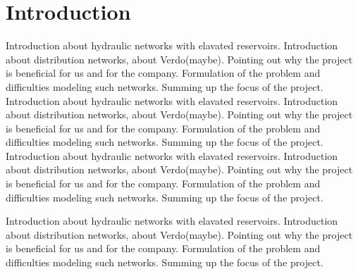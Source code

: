 \chapter{Introduction}
\label{introduction}

Introduction about hydraulic networks with elavated reservoirs. Introduction about distribution networks, about Verdo(maybe). Pointing out why the project is beneficial for us and for the company. Formulation of the problem and difficulties modeling such networks. Summing up the focus of the project. 
Introduction about hydraulic networks with elavated reservoirs. Introduction about distribution networks, about Verdo(maybe). Pointing out why the project is beneficial for us and for the company. Formulation of the problem and difficulties modeling such networks. Summing up the focus of the project. 
Introduction about hydraulic networks with elavated reservoirs. Introduction about distribution networks, about Verdo(maybe). Pointing out why the project is beneficial for us and for the company. Formulation of the problem and difficulties modeling such networks. Summing up the focus of the project. 

Introduction about hydraulic networks with elavated reservoirs. Introduction about distribution networks, about Verdo(maybe). Pointing out why the project is beneficial for us and for the company. Formulation of the problem and difficulties modeling such networks. Summing up the focus of the project.  




